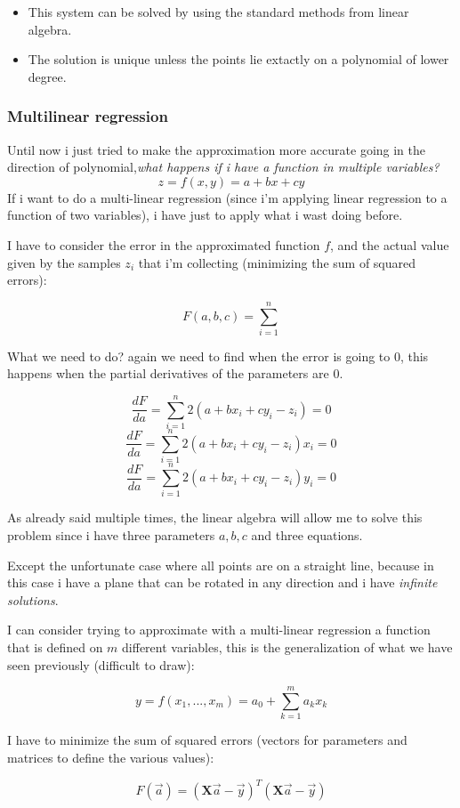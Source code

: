 \documentclass{article}
\begin{document}
\begin{itemize}
    \item This system can be solved by using the standard methods from linear algebra.
    \item The solution is unique unless the points lie extactly on a polynomial of
          lower degree.
\end{itemize}

\subsubsection{Multilinear regression}
Until now i just tried to make the approximation more accurate going in the
direction of polynomial,\textit{what happens if i have a function in multiple variables?}
$$z=f(x,y)=a+bx+cy$$
If i want to do a multi-linear regression (since i'm applying linear regression to a function
of two variables), i have just to apply what i wast doing before.

I have to consider the error in the approximated function $f$, and the actual value given
by the samples $z_i$ that i'm collecting (minimizing the sum of squared errors):

$$F(a,b,c)=\sum_{i=1}^{n}$$

What we need to do? again we need to find when the error is going to $0$, this happens when
the partial derivatives of the parameters are $0$.

$$\frac{dF}{da}=\sum_{i=1}^n 2(a+bx_i+cy_i-z_i)=0$$
$$\frac{dF}{da}=\sum_{i=1}^n 2(a+bx_i+cy_i-z_i)x_i=0$$
$$\frac{dF}{da}=\sum_{i=1}^n 2(a+bx_i+cy_i-z_i)y_i=0$$

As already said multiple times, the linear algebra will allow me to solve
this problem since i have three parameters $a,b,c$ and three equations.

Except the unfortunate case where all points are on a straight line, because in this case
i have a plane that can be rotated in any direction and i have \textit{infinite solutions}.

I can consider trying to approximate with a multi-linear regression a function that
is defined on $m$ different variables, this is the generalization of what we have
seen previously (difficult to draw):

$$y=f(x_1,...,x_m)=a_0+\sum_{k=1}^{m} a_k x_k$$

I have to minimize the sum of squared errors (vectors for parameters and matrices to define
the various values):

$$F(\vec{a})=(\textbf{X}\vec{a}-\vec{y})^T(\textbf{X}\vec{a}-\vec{y})$$
\end{document}
